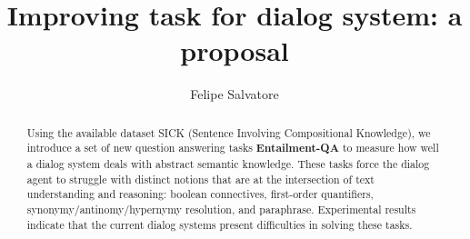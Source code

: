 \documentclass[12pt]{report}
\title{Improving task for dialog system: a proposal}
\author{Felipe Salvatore}
\begin{document}
\maketitle

\begin{abstract}
Using the available dataset SICK (Sentence Involving Compositional Knowledge), we introduce a set of new question answering tasks \textbf{Entailment-QA} to measure how well a dialog system deals with abstract semantic knowledge. These tasks force the dialog agent to struggle with distinct notions that are at the intersection of text understanding and reasoning: boolean connectives, first-order quantifiers, synonymy/antinomy/hypernymy resolution, and paraphrase. Experimental results indicate that the current dialog systems present difficulties in solving these tasks.
\end{abstract}
\tableofcontents









\end{document}
